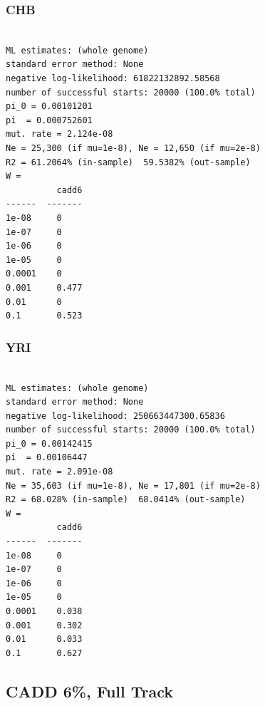 \documentclass[11pt]{article}
\begin{document}
\subsubsection*{CHB}
\begin{minipage}{\linewidth}\begin{footnotesize}
\begin{verbatim}

ML estimates: (whole genome)
standard error method: None
negative log-likelihood: 61822132892.58568
number of successful starts: 20000 (100.0% total)
pi_0 = 0.00101201
pi  = 0.000752601
mut. rate = 2.124e-08 
Ne = 25,300 (if mu=1e-8), Ne = 12,650 (if mu=2e-8)
R2 = 61.2064% (in-sample)  59.5382% (out-sample)
W = 
          cadd6
------  -------
1e-08     0
1e-07     0
1e-06     0
1e-05     0
0.0001    0
0.001     0.477
0.01      0
0.1       0.523
\end{verbatim}
\end{footnotesize}\end{minipage}


\subsubsection*{YRI}
\begin{minipage}{\linewidth}\begin{footnotesize}
\begin{verbatim}

ML estimates: (whole genome)
standard error method: None
negative log-likelihood: 250663447300.65836
number of successful starts: 20000 (100.0% total)
pi_0 = 0.00142415
pi  = 0.00106447
mut. rate = 2.091e-08 
Ne = 35,603 (if mu=1e-8), Ne = 17,801 (if mu=2e-8)
R2 = 68.028% (in-sample)  68.0414% (out-sample)
W = 
          cadd6
------  -------
1e-08     0
1e-07     0
1e-06     0
1e-05     0
0.0001    0.038
0.001     0.302
0.01      0.033
0.1       0.627
\end{verbatim}
\end{footnotesize}\end{minipage}


\subsection{CADD 6\%, Full Track}
\end{document}
